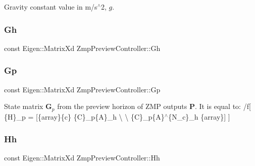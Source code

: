 Gravity constant value in m/s$^\wedge$2, $ g $. \hypertarget{classZmpPreviewController_a9429cb06fdd2c3ca5036a2fd48303632}{}\label{classZmpPreviewController_a9429cb06fdd2c3ca5036a2fd48303632} 
\subsubsection{\texorpdfstring{Gh}{Gh}}
{\footnotesize\ttfamily const Eigen\+::\+Matrix\+Xd Zmp\+Preview\+Controller\+::\+Gh\hspace{0.3cm}{\ttfamily [private]}}

\hypertarget{classZmpPreviewController_a53a7d8af5be4a5d5cea99fad2ea48979}{}\label{classZmpPreviewController_a53a7d8af5be4a5d5cea99fad2ea48979} 
\subsubsection{\texorpdfstring{Gp}{Gp}}
{\footnotesize\ttfamily const Eigen\+::\+Matrix\+Xd Zmp\+Preview\+Controller\+::\+Gp\hspace{0.3cm}{\ttfamily [private]}}

State matrix $\mathbf{G}_p$ from the preview horizon of Z\+MP outputs $\mathbf{P}$. It is equal to\+: /f\mbox{[} \{H\}\+\_\+p = \mbox{[}\{array\}\{c\} \{C\}\+\_\+p\{A\}\+\_\+h \textbackslash{}  \textbackslash{} \{C\}\+\_\+p\{A\}$^\wedge$\{N\+\_\+c\}\+\_\+h \{array\}\mbox{]} \mbox{]} \hypertarget{classZmpPreviewController_a8caaf8bf8f06e5b0b53d2cd5c131eefd}{}\label{classZmpPreviewController_a8caaf8bf8f06e5b0b53d2cd5c131eefd} 
\subsubsection{\texorpdfstring{Hh}{Hh}}
{\footnotesize\ttfamily const Eigen\+::\+Matrix\+Xd Zmp\+Preview\+Controller\+::\+Hh\hspace{0.3cm}{\ttfamily [private]}}

\hypertarget{classZmpPreviewController_a32ab17a3be30490e4a1e874bf3581843}{}\label{classZmpPreviewController_a32ab17a3be30490e4a1e874bf3581843} 
